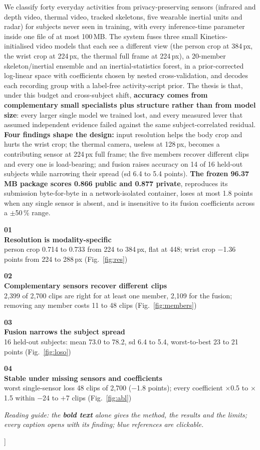 \documentclass[conference]{IEEEtran}
\newcommand{\finding}[3]{%
  \begin{minipage}[t]{0.235\textwidth}\raggedright\rmfamily
  {\color{gray}\fontsize{15}{15}\selectfont\bfseries #1}\\[1pt]
  {\color{ink}\small\bfseries #2}\\[2pt]
  {\color{ink}\footnotesize #3}
  \end{minipage}}
\begin{document}
{\begin{minipage}{\textwidth}
\noindent We classify forty everyday activities from privacy-preserving sensors (infrared and depth video, thermal video, tracked skeletons, five wearable inertial units and radar) for subjects never seen in training, with every inference-time parameter inside one file of at most 100\,MB. The system fuses three small Kinetics-initialised video models that each see a different view (the person crop at 384\,px, the wrist crop at 224\,px, the thermal full frame at 224\,px), a 20-member skeleton/inertial ensemble and an inertial-statistics forest, in a prior-corrected log-linear space with coefficients chosen by nested cross-validation, and decodes each recording group with a label-free activity-script prior. The thesis is that, under this budget and cross-subject shift, \textbf{accuracy comes from complementary small specialists plus structure rather than from model size}: every larger single model we trained lost, and every measured lever that assumed independent evidence failed against the same subject-correlated residual. \textbf{Four findings shape the design:} input resolution helps the body crop and hurts the wrist crop; the thermal camera, useless at 128\,px, becomes a contributing sensor at 224\,px full frame; the five members recover different clips and every one is load-bearing; and fusion raises accuracy on 14 of 16 held-out subjects while narrowing their spread (sd 6.4 to 5.4 points). \textbf{The frozen 96.37\,MB package scores 0.866 public and 0.877 private}, reproduces its submission byte-for-byte in a network-isolated container, loses at most 1.8 points when any single sensor is absent, and is insensitive to its fusion coefficients across a $\pm$50\,\% range.
\end{minipage}
\vspace{5pt}

\noindent\colorbox{band}{\begin{minipage}{\dimexpr\textwidth-2\fboxsep}
\vspace{3pt}
\finding{01}{Resolution is modality-specific}{person crop 0.714 to 0.733 from 224 to 384\,px, flat at 448; wrist crop $-$1.36 points from 224 to 288\,px (Fig.~\ref{fig:res})}\hfill
\finding{02}{Complementary sensors recover different clips}{2,399 of 2,700 clips are right for at least one member, 2,109 for the fusion; removing any member costs 11 to 48 clips (Fig.~\ref{fig:members})}\hfill
\finding{03}{Fusion narrows the subject spread}{16 held-out subjects: mean 73.0 to 78.2, sd 6.4 to 5.4, worst-to-best 23 to 21 points (Fig.~\ref{fig:loso})}\hfill
\finding{04}{Stable under missing sensors and coefficients}{worst single-sensor loss 48 clips of 2,700 ($-$1.8 points); every coefficient $\times$0.5 to $\times$1.5 within $-$24 to $+$7 clips (Fig.~\ref{fig:abl})}
\vspace{3pt}
\end{minipage}}
\vspace{3pt}
{\centering\footnotesize\itshape Reading guide: the \textbf{bold text} alone gives the method, the results and the limits; every caption opens with its finding; \textcolor{linkblue}{blue} references are clickable.\par}
\vspace{6pt}
}]
\makeatother
\end{document}
